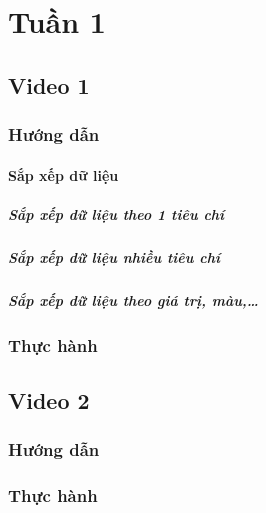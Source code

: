 \documentclass{article}
\begin{document}
\section{Tuần 1}



\subsection{Video 1}

\subsubsection{Hướng dẫn}

\paragraph{Sắp xếp dữ liệu}
\subparagraph{Sắp xếp dữ liệu theo 1 tiêu chí}

\subparagraph{Sắp xếp dữ liệu nhiều tiêu chí}

\subparagraph{Sắp xếp dữ liệu theo giá trị, màu,\dots}













\subsubsection{Thực hành}



\subsection{Video 2}
\subsubsection{Hướng dẫn}

\subsubsection{Thực hành}
\end{document}
